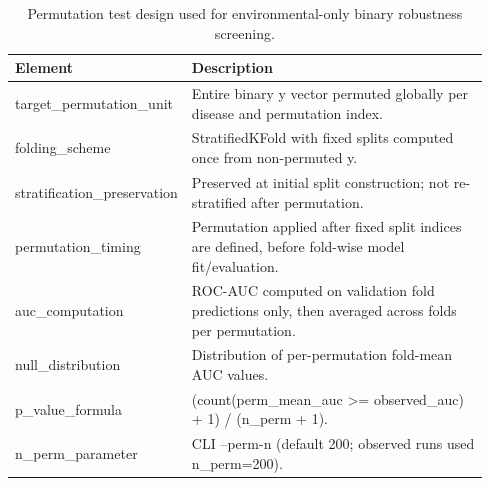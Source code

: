 \begin{table}[htbp]
\centering
\small
\begin{tabular}{p{0.30\linewidth} p{0.64\linewidth}}
\toprule
Element & Description \\
\midrule
target\_permutation\_unit & Entire binary y vector permuted globally per disease and permutation index. \\
folding\_scheme & StratifiedKFold with fixed splits computed once from non-permuted y. \\
stratification\_preservation & Preserved at initial split construction; not re-stratified after permutation. \\
permutation\_timing & Permutation applied after fixed split indices are defined, before fold-wise model fit/evaluation. \\
auc\_computation & ROC-AUC computed on validation fold predictions only, then averaged across folds per permutation. \\
null\_distribution & Distribution of per-permutation fold-mean AUC values. \\
p\_value\_formula & (count(perm\_mean\_auc >= observed\_auc) + 1) / (n\_perm + 1). \\
n\_perm\_parameter & CLI --perm-n (default 200; observed runs used n\_perm=200). \\
\bottomrule
\end{tabular}
\caption{Permutation test design used for environmental-only binary robustness screening.}
\label{tab:permutation_protocol}
\end{table}
